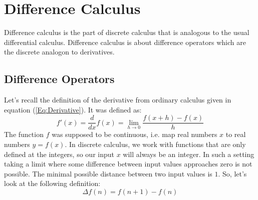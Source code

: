 


\section{Difference Calculus}
Difference calculus is the part of discrete calculus that is analogous to the usual differential calculus. Difference calculus is about difference operators which are the discrete analogon to derivatives.


\subsection{Difference Operators}
Let's recall the definition of the derivative from ordinary calculus given in equation (\ref{Eq:Derivative}). It was defined as:
\begin{equation}
 f'(x) = \frac{d}{dx} f(x) = \lim_{h \rightarrow 0} \frac{f(x + h) - f(x)}{h}
\end{equation}
The function $f$ was supposed to be continuous, i.e. map real numbers $x$ to real numbers $y = f(x)$. In discrete calculus, we work with functions that are only defined at the integers, so our input $x$ will always be an integer. In such a setting taking a limit where some difference between input values approaches zero is not possible. The minimal possible distance between two input values is $1$. So, let's look at the following definition:
\begin{equation}
\label{Eq:ForwardDifference}
 \Delta f(n) = f(n+1) - f(n)
\end{equation}



